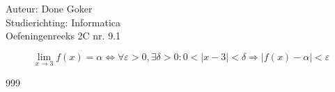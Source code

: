 \documentclass[a4paper]{article}
\begin{document}
  
\noindent \large Auteur: Done Goker \\
\noindent \large Studierichting: Informatica\\
\noindent \large Oefeningenreeks 2C nr. 9.1\\

\medskip

\normalsize

$$
\lim\limits_{x\rightarrow 3} f(x) = \alpha \Leftrightarrow
\forall \varepsilon>0, \exists\delta>0:
0< \lvert x-3 \lvert <\delta
\Rightarrow \lvert f(x)-\alpha \lvert <\varepsilon
$$
\begin{thebibliography}{999}
\end{thebibliography}
\end{document}
